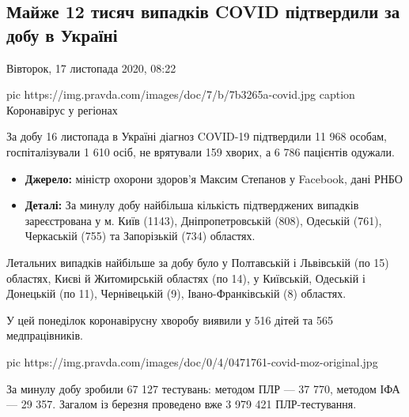  
 
 

\subsection{Майже 12 тисяч випадків COVID підтвердили за добу в Україні}
\label{sec:16_11_2020.news.ua.pravda.1.kovid_stats_12000_cases}

Вівторок, 17 листопада 2020, 08:22

\ifcmt
pic https://img.pravda.com/images/doc/7/b/7b3265a-covid.jpg
caption Коронавірус у регіонах
\fi

За добу 16 листопада в Україні діагноз COVID-19 підтвердили 11 968 особам,
госпіталізували 1 610 осіб, не врятували 159 хворих, а 6 786 пацієнтів одужали. 

\begin{itemize}
	
\item \textbf{Джерело:} міністр охорони здоров'я Максим Степанов у Facebook, дані РНБО

\item \textbf{Деталі:} За минулу добу найбільша кількість підтверджених випадків зареєстрована
у м. Київ (1143), Дніпропетровській (808), Одеській (761), Черкаській (755) та
Запорізькій (734) областях.
\end{itemize}

Летальних випадків найбільше за добу було у Полтавській і Львівській (по 15)
областях, Києві й Житомирській областях (по 14), у Київській, Одеській і
Донецькій (по 11), Чернівецькій (9), Івано-Франківській (8)  областях.

У цей понеділок коронавірусну хворобу виявили у 516 дітей та 565
медпрацівників.

\ifcmt
pic https://img.pravda.com/images/doc/0/4/0471761-covid-moz-original.jpg
\fi

За минулу добу зробили 67 127 тестувань: методом ПЛР --- 37 770, методом ІФА --- 29
357. Загалом із березня проведено вже 3 979 421 ПЛР-тестування. 

